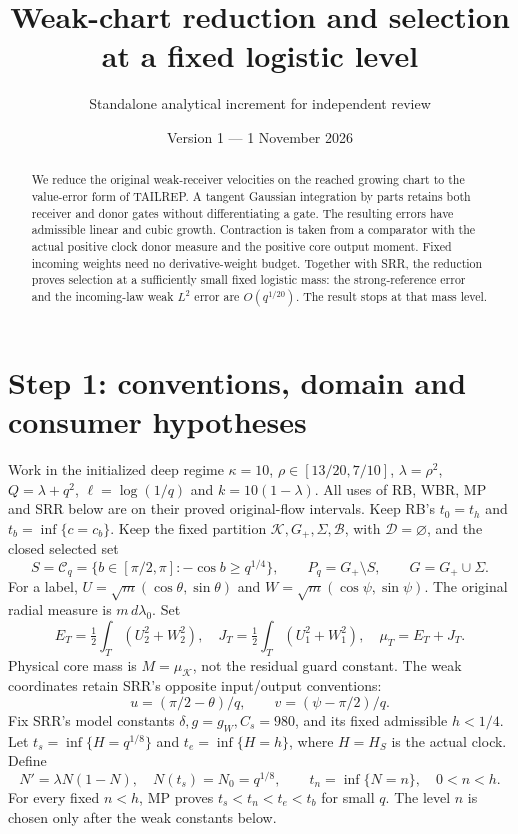 \documentclass[11pt]{article}
\title{Weak-chart reduction and selection at a fixed logistic level}
\author{Standalone analytical increment for independent review}
\date{Version 1 --- 1 November 2026}
\numberwithin{equation}{section}
\theoremstyle{remark}\newtheorem{remark}[theorem]{Remark}
\newcommand{\KK}{\mathcal K}\newcommand{\BB}{\mathcal B}
\newcommand{\Gp}{{G_+}}\newcommand{\eps}{\varepsilon}
\begin{document}
\maketitle
\begin{abstract}
We reduce the original weak-receiver velocities on the reached growing
chart to the value-error form of TAILREP. A tangent Gaussian integration
by parts retains both receiver and donor gates without differentiating
a gate. The resulting errors have admissible linear and cubic growth.
Contraction is taken from a comparator with the actual positive clock
donor measure and the positive core output moment. Fixed incoming
weights need no derivative-weight budget. Together with SRR, the
reduction proves selection at a sufficiently small fixed logistic mass:
the strong-reference error and the incoming-law weak $L^2$ error are
$O(q^{1/20})$. The result stops at that mass level.
\end{abstract}

\section{Step 1: conventions, domain and consumer hypotheses}
\label{an03wcsv1:inventory}
Work in the initialized deep regime $\kappa=10$,
$\rho\in[13/20,7/10]$, $\lambda=\rho^2$, $Q=\lambda+q^2$,
$\ell=\log(1/q)$ and $k=10(1-\lambda)$. All uses of RB, WBR,
MP and SRR below are on their proved original-flow intervals.
Keep RB's $t_0=t_h$ and $t_b=\inf\{c=c_b\}$. Keep the fixed
partition $\KK,\Gp,\Sigma,\BB$, with $\mathcal D=\varnothing$,
and the closed selected set
\[
 S=\mathcal C_q=\{b\in[\pi/2,\pi]:-\cos b\ge q^{1/4}\},
 \qquad P_q=\Gp\setminus S,\qquad G=\Gp\cup\Sigma.
\]
For a label, $U=\sqrt m(\cos\theta,\sin\theta)$ and
$W=\sqrt m(\cos\psi,\sin\psi)$. The original radial measure
is $m\,d\lambda_0$. Set
\[
 E_T=\tfrac12\int_T(U_2^2+W_2^2),\quad
 J_T=\tfrac12\int_T(U_1^2+W_1^2),\quad \mu_T=E_T+J_T.
\]
Physical core mass is $M=\mu_\KK$, not the residual guard constant.
The weak coordinates retain SRR's opposite input/output conventions:
\[
 u=(\pi/2-\theta)/q,\qquad v=(\psi-\pi/2)/q.
\]
Fix SRR's model constants $\delta,g=g_W,C_s=980$, and its fixed
admissible $h<1/4$. Let $t_s=\inf\{H=q^{1/8}\}$ and
$t_e=\inf\{H=h\}$, where $H=H_S$ is the actual clock. Define
\begin{equation}
 N'=\lambda N(1-N),\quad N(t_s)=N_0=q^{1/8},\qquad
 t_n=\inf\{N=n\},\quad 0<n<h.
 \label{an03wcsv1:logistic}
\end{equation}
For every fixed $n<h$, MP proves $t_s<t_n<t_e<t_b$ for small $q$.
The level $n$ is chosen only after the weak constants below.
\end{document}
